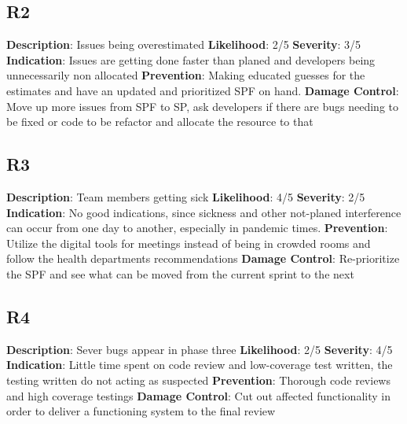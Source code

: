 \documentclass{article}
\begin{document}
\subsection{R2}
\textbf{Description}: Issues being overestimated \newline
\textbf{Likelihood}: 2/5\newline
\textbf{Severity}: 3/5\newline
\textbf{Indication}: Issues are getting done faster than planed and developers being unnecessarily non allocated \newline
\textbf{Prevention}: Making educated guesses for the estimates and have an updated and prioritized SPF on hand. \newline
\textbf{Damage Control}: Move up more issues from SPF to SP, ask developers if there are bugs needing to be fixed or code to be refactor and allocate the resource to that \newline

\subsection{R3}
\textbf{Description}: Team members getting sick \newline
\textbf{Likelihood}: 4/5\newline
\textbf{Severity}: 2/5\newline
\textbf{Indication}: No good indications, since sickness and other not-planed interference can occur from one day to another, especially in pandemic times. \newline
\textbf{Prevention}: Utilize the digital tools for meetings instead of being in crowded rooms and follow the health departments recommendations \newline
\textbf{Damage Control}: Re-prioritize the SPF and see what can be moved from the current sprint to the next \newline

\subsection{R4}
\textbf{Description}: Sever bugs appear in phase three \newline
\textbf{Likelihood}: 2/5\newline
\textbf{Severity}: 4/5  \newline
\textbf{Indication}: Little time spent on code review and low-coverage test written, the testing written do not acting as suspected \newline
\textbf{Prevention}: Thorough code reviews and high coverage testings \newline
\textbf{Damage Control}: Cut out affected functionality in order to deliver a functioning system to the final review \newline
\end{document}
